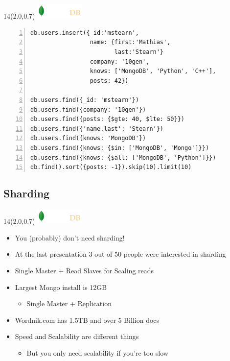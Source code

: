 \documentclass{beamer}
\newcommand{\MongoLogo}{
\begin{textblock}{14}(2.0,0.7)
  \includegraphics[height=0.8cm]{logo-mongodb-ondark.png}
\end{textblock}
}
\begin{document}
\begin{frame}[fragile]
  \MongoLogo

  \small
  \begin{lstlisting}[numbers=left, numberstyle=\tiny\color{red}]
db.users.insert({_id:'mstearn',
                 name: {first:'Mathias',
                        last:'Stearn'}
                 company: '10gen',
                 knows: ['MongoDB', 'Python', 'C++'],
                 posts: 42})
                 
db.users.find({_id: 'mstearn'})
db.users.find({company: '10gen'})
db.users.find({posts: {$gte: 40, $lte: 50}})
db.users.find({'name.last': 'Stearn'})
db.users.find({knows: 'MongoDB'})
db.users.find({knows: {$in: ['MongoDB', 'Mongo']}})
db.users.find({knows: {$all: ['MongoDB', 'Python']}})
db.find().sort({posts: -1}).skip(10).limit(10)
  \end{lstlisting}
\end{frame}

\subsection{Sharding}
\begin{frame}[fragile]
  \MongoLogo
  \begin{itemize}
    \item You {\tiny (probably)} don't need sharding!
    \item At the last presentation 3 out of 50 people were interested in sharding
    \item Single Master + Read Slaves for Scaling reads
    \item Largest Mongo install is 12GB
      \begin{itemize}
        \item Single Master + Replication
      \end{itemize}
    \item Wordnik.com has 1.5TB and over 5 Billion docs

    \item Speed and Scalability are different things
      \begin{itemize}
        \item But you only need scalability if you're too slow
      \end{itemize}
  \end{itemize}
\end{frame}
\end{document}
